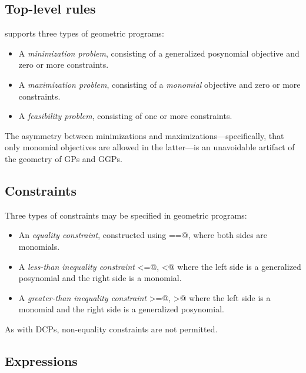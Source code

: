 \documentclass[12pt]{article}
\begin{document}
\subsection{Top-level rules}

\cvx supports three types of geometric programs:
\begin{itemize}
\item A \emph{minimization problem}, consisting of a generalized posynomial objective and
zero or more constraints.
\item A \emph{maximization problem}, consisting of a \emph{monomial} objective and
zero or more constraints.
\item A \emph{feasibility problem}, consisting of one or more constraints.
\end{itemize}
The asymmetry between minimizations and maximizations---specifically, that only monomial
objectives are allowed in the latter---is an unavoidable artifact of
the geometry of GPs and GGPs.

\subsection{Constraints}

Three types of constraints may be specified in geometric programs:
\begin{itemize}
\item An \emph{equality constraint}, constructed using \verb@==@,
where both sides are monomials.
\item A \emph{less-than inequality constraint} \verb@<=@, \verb@<@ 
where the left side is a generalized posynomial and the right side is a monomial.
\item A \emph{greater-than inequality constraint} \verb@>=@, \verb@>@ 
where the left side is a monomial and the right side is a generalized posynomial.
\end{itemize}
As with DCPs, non-equality constraints are not permitted.

\subsection{Expressions}
\label{sec:gp-expressions}
\end{document}
